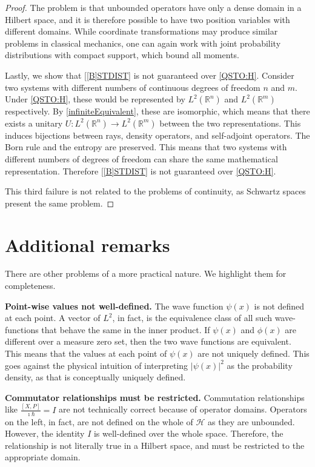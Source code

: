 \documentclass{techbrief}
\begin{document}
\begin{proof}
	The problem is that unbounded operators have only a dense domain in a Hilbert space, and it is therefore possible to have two position variables with different domains. While coordinate transformations may produce similar problems in classical mechanics, one can again work with joint probability distributions with compact support, which bound all moments.
	
	Lastly, we show that \ref{[B]STDIST} is not guaranteed over \ref{QSTO:H}. Consider two systems with different numbers of continuous degrees of freedom $n$ and $m$. Under \ref{QSTO:H}, these would be represented by $L^2(\mathbb{R}^n)$ and $L^2(\mathbb{R}^m)$ respectively. By \ref{infiniteEquivalent}, these are isomorphic, which means that there exists a unitary $U : L^2(\mathbb{R}^n) \to L^2(\mathbb{R}^m)$ between the two representations. This induces bijections between rays, density operators, and self-adjoint operators. The Born rule and the entropy are preserved. This means that two systems with different numbers of degrees of freedom can share the same mathematical representation. Therefore \ref{[B]STDIST} is not guaranteed over \ref{QSTO:H}.
	
	This third failure is not related to the problems of continuity, as Schwartz spaces present the same problem.
\end{proof}

\section{Additional remarks}

There are other problems of a more practical nature. We highlight them for completeness.

\textbf{Point-wise values not well-defined.} The wave function $\psi(x)$ is not defined at each point. A vector of $L^2$, in fact, is the equivalence class of all such wave-functions that behave the same in the inner product. If $\psi(x)$ and $\phi(x)$ are different over a measure zero set, then the two wave functions are equivalent. This means that the values at each point of $\psi(x)$ are not uniquely defined. This goes against the physical intuition of interpreting $|\psi(x)|^2$ as the probability density, as that is conceptually uniquely defined.

\textbf{Commutator relationships must be restricted.} Commutation relationships like $\frac{[X,P]}{\imath\hbar} = I$ are not technically correct because of operator domains. Operators on the left, in fact, are not defined on the whole of $\mathcal{H}$ as they are unbounded. However, the identity $I$ is well-defined over the whole space. Therefore, the relationship is not literally true in a Hilbert space, and must be restricted to the appropriate domain.
\end{document}
